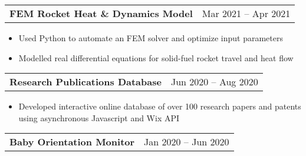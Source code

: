 \documentclass[a4paper,10pt]{article}
\begin{document}
\begin{tabularx}{\linewidth}{@{}X r@{}}
\begin{minipage}[t]{\linewidth}
  \textbf{FEM Rocket Heat \& Dynamics Model}
\end{minipage}
&     Mar 2021 -- Apr 2021
\\[3.75pt]
\end{tabularx}
\begin{itemize}[nosep,after=\strut, leftmargin=1em, itemsep=3pt,label=--]
  \item Used Python to automate an FEM solver and optimize input parameters
\item Modelled real differential equations for solid-fuel rocket travel and heat flow
\end{itemize}
\begin{tabularx}{\linewidth}{@{}X r@{}}
\begin{minipage}[t]{\linewidth}
  \textbf{Research Publications Database}
\end{minipage}
&     Jun 2020 -- Aug 2020
\\[3.75pt]
\end{tabularx}
\begin{itemize}[nosep,after=\strut, leftmargin=1em, itemsep=3pt,label=--]
  \item Developed interactive online database of over 100 research papers and patents using asynchronous Javascript and Wix API
\end{itemize}
\begin{tabularx}{\linewidth}{@{}X r@{}}
\begin{minipage}[t]{\linewidth}
  \textbf{Baby Orientation Monitor}
\end{minipage}
&     Jan 2020 -- Jun 2020
\\[3.75pt]
\end{tabularx}
\end{document}
